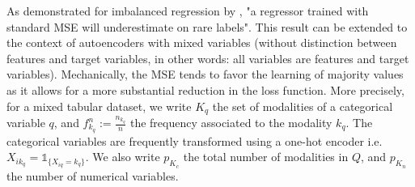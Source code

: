 \documentclass{article}
\def \ind{\mathbb 1}
\newtheorem{rem}{{\sc Remark}}
\theoremstyle{definition}
\begin{document}
As demonstrated for imbalanced regression by \citep{ren2022balanced}, "a regressor trained with standard MSE will underestimate on rare labels". This result can be extended to the context of autoencoders with mixed variables (without distinction between features and target variables, in other words: all variables are features and target variables). Mechanically, the MSE tends to favor the learning of majority values as it allows for a more substantial reduction in the loss function. 
More precisely, for a mixed tabular dataset, 
we write $K_q$ the set of modalities of  a categorical variable $q$, and $f^n_{k_q}:=\frac{n_{k_q}}{n}$  the frequency associated to the modality $k_q$. 
The categorical variables are frequently transformed using a one-hot encoder i.e. $X_{ik_q} = \ind_{\{X_{iq}=k_q\}}$. 
We also write   $p_{K_c}$ the total number of modalities in $Q$,  
and $p_{K_n}$  the number of numerical variables. 
\end{document}
